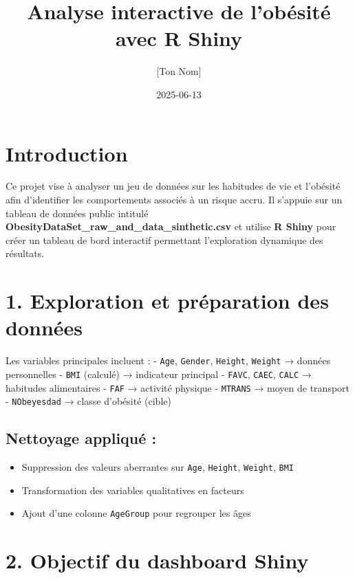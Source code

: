 \documentclass[
]{article}
\title{Analyse interactive de l'obésité avec R Shiny}
\author{{[}Ton Nom{]}}
\date{2025-06-13}
\providecommand{\tightlist}{%
  \setlength{\itemsep}{0pt}\setlength{\parskip}{0pt}}
\begin{document}
\maketitle

\section{Introduction}\label{introduction}

Ce projet vise à analyser un jeu de données sur les habitudes de vie et
l'obésité afin d'identifier les comportements associés à un risque
accru. Il s'appuie sur un tableau de données public intitulé
\textbf{ObesityDataSet\_raw\_and\_data\_sinthetic.csv} et utilise
\textbf{R Shiny} pour créer un tableau de bord interactif permettant
l'exploration dynamique des résultats.

\section{1. Exploration et préparation des
données}\label{exploration-et-pruxe9paration-des-donnuxe9es}

Les variables principales incluent : - \texttt{Age}, \texttt{Gender},
\texttt{Height}, \texttt{Weight} → données personnelles - \texttt{BMI}
(calculé) → indicateur principal - \texttt{FAVC}, \texttt{CAEC},
\texttt{CALC} → habitudes alimentaires - \texttt{FAF} → activité
physique - \texttt{MTRANS} → moyen de transport - \texttt{NObeyesdad} →
classe d'obésité (cible)

\subsection{Nettoyage appliqué :}\label{nettoyage-appliquuxe9}

\begin{itemize}
\tightlist
\item
  Suppression des valeurs aberrantes sur \texttt{Age}, \texttt{Height},
  \texttt{Weight}, \texttt{BMI}
\item
  Transformation des variables qualitatives en facteurs
\item
  Ajout d'une colonne \texttt{AgeGroup} pour regrouper les âges
\end{itemize}

\section{2. Objectif du dashboard
Shiny}\label{objectif-du-dashboard-shiny}
\end{document}
